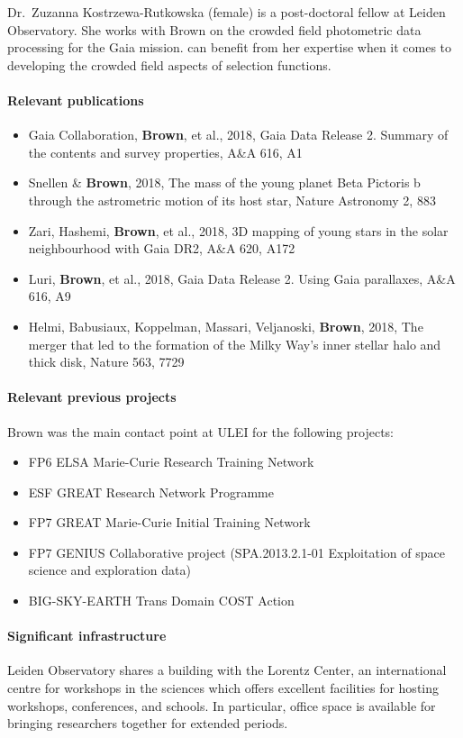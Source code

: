 Dr.~Zuzanna Kostrzewa-Rutkowska (female) is a post-doctoral fellow at Leiden Observatory. She works with Brown on the crowded field photometric data processing for the Gaia mission. {\acro} can benefit from her expertise when it comes to developing the crowded field aspects of selection functions.


\paragraph{Relevant publications}
\begin{itemize}
    \item Gaia Collaboration, \textbf{Brown}, et al., 2018, Gaia Data Release 2. Summary of the contents and survey properties, A\&A 616, A1 
    \item Snellen \& \textbf{Brown}, 2018, The mass of the young planet Beta Pictoris b through the astrometric motion of its host star, Nature Astronomy 2, 883 
    \item Zari, Hashemi, \textbf{Brown}, et al., 2018, 3D mapping of young stars in the solar neighbourhood with Gaia DR2, A\&A 620, A172 
    \item  Luri, \textbf{Brown}, et al., 2018, Gaia Data Release 2. Using Gaia parallaxes, A\&A 616, A9 
    \item Helmi, Babusiaux, Koppelman, Massari, Veljanoski, \textbf{Brown}, 2018, The merger that led to the formation of the Milky Way's inner stellar halo and thick disk, Nature 563, 7729 
\end{itemize}

\paragraph{Relevant previous projects}
Brown was the main contact point at ULEI for the following projects:
\begin{itemize}
    \item FP6 ELSA Marie-Curie Research Training Network
    \item ESF GREAT Research Network Programme 
    \item FP7 GREAT Marie-Curie Initial Training Network
    \item FP7 GENIUS Collaborative project (SPA.2013.2.1-01 Exploitation of space science and exploration data)
    \item BIG-SKY-EARTH Trans Domain COST Action
\end{itemize}

\paragraph{Significant infrastructure}
Leiden Observatory shares a building with the Lorentz Center, an international centre for workshops in the sciences which offers excellent facilities for hosting workshops, conferences, and schools. In particular, office space is available for bringing researchers together for extended periods.